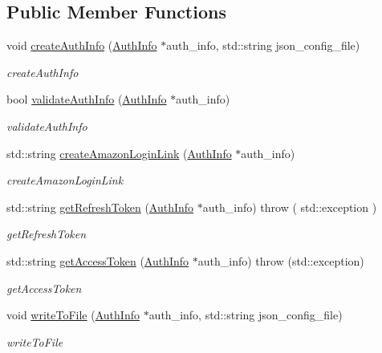 \subsection*{Public Member Functions}
\begin{DoxyCompactItemize}
\item 
void \hyperlink{classAuth_1_1Authenticator_adb3592c127b89984e9fb3d621175f0a0}{create\+Auth\+Info} (\hyperlink{classAuth_1_1AuthInfo}{Auth\+Info} $\ast$auth\+\_\+info, std\+::string json\+\_\+config\+\_\+file)
\begin{DoxyCompactList}\small\item\em create\+Auth\+Info \end{DoxyCompactList}\item 
bool \hyperlink{classAuth_1_1Authenticator_accb5d9b70982e7118136b81e0b0e2a4e}{validate\+Auth\+Info} (\hyperlink{classAuth_1_1AuthInfo}{Auth\+Info} $\ast$auth\+\_\+info)
\begin{DoxyCompactList}\small\item\em validate\+Auth\+Info \end{DoxyCompactList}\item 
std\+::string \hyperlink{classAuth_1_1Authenticator_a7b2e8bca0377fe2a935f679b70069043}{create\+Amazon\+Login\+Link} (\hyperlink{classAuth_1_1AuthInfo}{Auth\+Info} $\ast$auth\+\_\+info)
\begin{DoxyCompactList}\small\item\em create\+Amazon\+Login\+Link \end{DoxyCompactList}\item 
std\+::string \hyperlink{classAuth_1_1Authenticator_a2f826abed3c44795178ed74f4f9fbc0c}{get\+Refresh\+Token} (\hyperlink{classAuth_1_1AuthInfo}{Auth\+Info} $\ast$auth\+\_\+info)  throw ( std\+::exception )
\begin{DoxyCompactList}\small\item\em get\+Refresh\+Token \end{DoxyCompactList}\item 
std\+::string \hyperlink{classAuth_1_1Authenticator_ae75b09665bc042b3e599a22ec12fed71}{get\+Access\+Token} (\hyperlink{classAuth_1_1AuthInfo}{Auth\+Info} $\ast$auth\+\_\+info)  throw (std\+::exception)
\begin{DoxyCompactList}\small\item\em get\+Access\+Token \end{DoxyCompactList}\item 
void \hyperlink{classAuth_1_1Authenticator_a9e817e28311f11dcdf59ed637d28319f}{write\+To\+File} (\hyperlink{classAuth_1_1AuthInfo}{Auth\+Info} $\ast$auth\+\_\+info, std\+::string json\+\_\+config\+\_\+file)
\begin{DoxyCompactList}\small\item\em write\+To\+File \end{DoxyCompactList}\end{DoxyCompactItemize}

